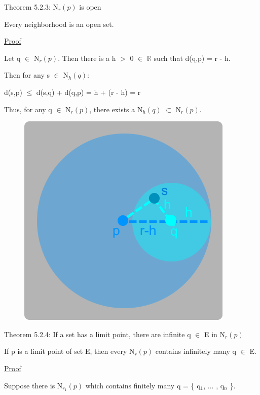 \newpage

{ \color{red} Theorem 5.2.3: N$_r(p)$ is open } 

	\begin{adjustbox}{minipage=14cm, right}
		Every neighborhood is an open set.
	\end{adjustbox}

{ \color{magenta} \underline{Proof} } 
	
	Let q $\in$ N$_r(p)$. Then there is a h $>$ 0 $\in$ $\mathbb{R}$
	such that d(q,p) = r - h.

	Then for any s $\in$ N$_h(q)$:

	\qquad d(s,p) $\leq$  d(s,q) + d(q,p) = h + (r - h) = r

	Thus, for any q $\in$ N$_r(p)$, there exists a N$_h(q)$ $\subset$ N$_r(p)$.

\begin{figure}[h]
	\centering
	\includegraphics[scale=0.38]{Images/5.2.3.png}
\end{figure}

{ \color{red} Theorem 5.2.4: If a set has a limit point, there are infinite q
$\in$ E in N$_r(p)$ } 
	
	\begin{adjustbox}{minipage=14cm, right}
		If p is a limit point of set E, then every N$_r(p)$ contains infinitely many q $\in$ E.
	\end{adjustbox}

{ \color{magenta} \underline{Proof} } 
	
	Suppose there is N$_{r_1}(p)$ which contains finitely many q = \{ q$_1$, ... , q$_n$ \}.

